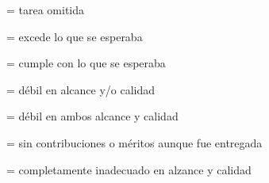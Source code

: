 \begin{description}[itemsep=0em]
\item[NP]{= tarea omitida}
\item[5]{= excede lo que se esperaba}
\item[4]{= cumple con lo que se esperaba}
\item[3]{= d\'{e}bil en alcance y/o calidad}
\item[2]{= d\'{e}bil en ambos alcance y calidad}
\item[1]{= sin contribuciones o m\'{e}ritos aunque fue entregada}
\item[0]{= completamente inadecuado en alzance y calidad}
\end{description}
